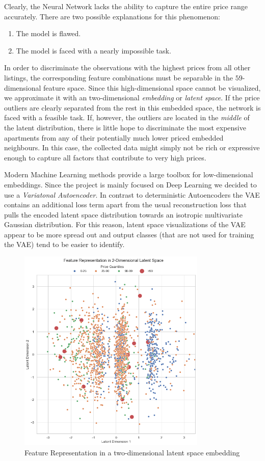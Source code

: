 \documentclass[12pt, letterpaper]{article}
\begin{document}
Clearly, the Neural Network lacks the ability to capture the entire price range accurately.
There are two possible explanations for this phenomenon:
\begin{enumerate}
    \item The model is flawed.
    \item The model is faced with a nearly impossible task.
\end{enumerate}
In order to discriminate the observations with the highest prices from all other listings, the corresponding feature combinations must be separable in the $59$-dimensional feature space.
Since this high-dimensional space cannot be visualized, we approximate it with an two-dimensional \emph{embedding} or \emph{latent space}.
If the price outliers are clearly separated from the rest in this embedded space, the network is faced with a feasible task.
If, however, the outliers are located in the \emph{middle} of the latent distribution, there is little hope to discriminate the most expensive apartments from any of their potentially much lower priced embedded neighbours.
In this case, the collected data might simply not be rich or expressive enough to capture all factors that contribute to very high prices.

Modern Machine Learning methods provide a large toolbox for low-dimensional embeddings.
Since the project is mainly focused on Deep Learning we decided to use a \emph{Variatonal Autoencoder}.
In contrast to deterministic Autoencoders the VAE contains an additional loss term apart from the usual reconstruction loss that pulls the encoded latent space distribution towards an isotropic multivariate Gaussian distribution.
For this reason, latent space visualizations of the VAE appear to be more spread out and output classes (that are not used for training the VAE) tend to be easier to identify.

\begin{figure}[t]
    \centering
    \includegraphics[width=0.8\textwidth]{latent_representation.png}
    \caption{Feature Representation in a two-dimensional latent space embedding}
    \label{fig:latent-representation}
\end{figure}
\end{document}

